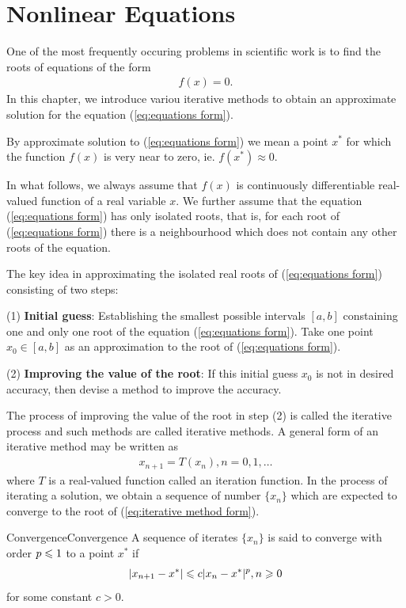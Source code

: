 \chapter{Nonlinear Equations}

One of the most frequently occuring problems in scientific work is to find the roots of
equations of the form 
\begin{align}
    \label{eq:equations form}
    f(x)=0.
\end{align}
In this chapter, we introduce variou iterative methods 
to obtain an approximate solution for the equation (\ref{eq:equations form}).
\par
By approximate solution to (\ref{eq:equations form}) we mean a point $x^*$
for which the function $f(x)$ is very near to zero, ie. $f(x^*)\approx 0$.
\par
In what follows, we always assume that $f(x)$ is continuously differentiable real-valued function 
of a real variable $x$. We further assume that the equation (\ref{eq:equations form}) has only isolated roots,
that is, for each root of (\ref{eq:equations form}) there is a neighbourhood
which does not contain any other roots of the equation.
\par
The key idea in approximating the isolated real roots of (\ref{eq:equations form})
consisting of two steps:
\par
(1) \textbf{Initial guess}: 
Establishing the smallest possible intervals $[a,b]$
constaining one and only one root of the equation (\ref{eq:equations form}).
Take one point $x_0\in [a,b]$ as an approximation to the root of (\ref{eq:equations form}).
\par
(2) \textbf{Improving the value of the root}: If this initial guess $x_0$ is not in desired accuracy, 
then devise a method to improve the accuracy.
\par
\noindent The process of improving the value of the root in step (2) is called the iterative process and
such methods are called iterative methods. A general form of an iterative method may be written as 
\begin{align}
    x_{n+1}=T(x_n),n=0,1,\dots
    \label{eq:iterative method form}
\end{align}
where $T$ is a real-valued function called an iteration function. In the process of iterating a solution,
we obtain a sequence of number $\{x_n\}$ which are expected to converge to the root of (\ref{eq:iterative method form}).

\begin{definition}{Convergence}{Convergence}
    A sequence of iterates $\{x_n\}$ is said to converge with order $p\leqslant 1$ to a point $x^*$ if
    \begin{align}
        |x_{n+1}-x^*|\leqslant c|x_n-x^*|^p,n\geqslant 0
    \end{align}
    for some constant $c>0$.
\end{definition}

